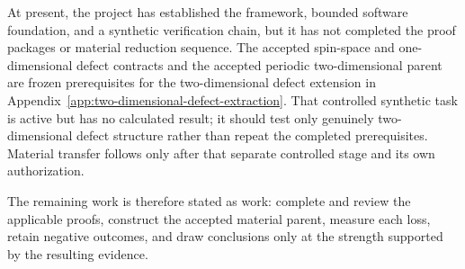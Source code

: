 At present, the project has established the framework, bounded software
foundation, and a synthetic verification chain, but it has not completed the
proof packages or material reduction sequence. The accepted spin-space and
one-dimensional defect contracts and the accepted periodic two-dimensional
parent are frozen prerequisites for the two-dimensional defect extension in
Appendix~\ref{app:two-dimensional-defect-extraction}. That controlled synthetic
task is active but has no calculated result; it should test only genuinely
two-dimensional defect structure rather than repeat the completed
prerequisites. Material transfer follows only after that separate controlled
stage and its own authorization.

The remaining work is therefore stated as work: complete and review the
applicable proofs, construct the accepted material parent, measure each loss,
retain negative outcomes, and draw conclusions only at the strength supported
by the resulting evidence.
